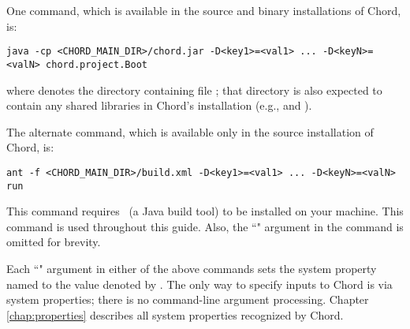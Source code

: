 One command, which is available in the source and binary installations of
Chord, is:

\begin{framed}
\begin{verbatim}
java -cp <CHORD_MAIN_DIR>/chord.jar -D<key1>=<val1> ... -D<keyN>=<valN> chord.project.Boot
\end{verbatim}
\end{framed}

where  denotes the directory containing file
; that directory is also expected to contain any shared
libraries in Chord's installation (e.g.,  and
).

The alternate command, which is available only in the source installation of
Chord, is:

\begin{framed}
\begin{verbatim}
ant -f <CHORD_MAIN_DIR>/build.xml -D<key1>=<val1> ... -D<keyN>=<valN> run
\end{verbatim}
\end{framed}

This command requires \ant\ (a Java build tool) to be installed on your
machine.  This command is used throughout this guide.  Also, the
``" argument in the command is omitted
for brevity.

Each ``" argument in either of the above commands sets the
system property named  to the value denoted by .  The
only way to specify inputs to Chord is via system properties; there is no
command-line argument processing.  Chapter \ref{chap:properties} describes all
system properties recognized by Chord.

